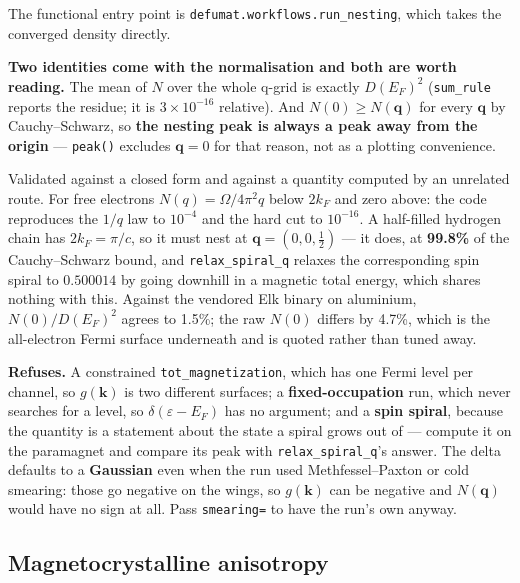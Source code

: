 \documentclass[11pt,a4paper]{article}
\newcommand{\code}[1]{\texttt{\small #1}}
\begin{document}
The functional entry point is \code{defumat.workflows.run\_nesting}, which
takes the converged density directly.

\textbf{Two identities come with the normalisation and both are worth reading.}
The mean of $N$ over the whole q-grid is exactly $D(E_F)^2$
(\code{sum\_rule} reports the residue; it is $3\times10^{-16}$ relative). And
$N(0) \ge N(\mathbf q)$ for every $\mathbf q$ by Cauchy--Schwarz, so
\textbf{the nesting peak is always a peak away from the origin} ---
\code{peak()} excludes $\mathbf q = 0$ for that reason, not as a plotting
convenience.

Validated against a closed form and against a quantity computed by an unrelated
route. For free electrons $N(q) = \Omega/4\pi^2 q$ below $2k_F$ and zero above:
the code reproduces the $1/q$ law to $10^{-4}$ and the hard cut to $10^{-16}$. A
half-filled hydrogen chain has $2k_F = \pi/c$, so it must nest at
$\mathbf q = (0,0,\tfrac12)$ --- it does, at \textbf{99.8\%} of the
Cauchy--Schwarz bound, and \code{relax\_spiral\_q} relaxes the corresponding
spin spiral to $0.500014$ by going downhill in a magnetic total energy, which
shares nothing with this. Against the vendored Elk binary on aluminium,
$N(0)/D(E_F)^2$ agrees to 1.5\%; the raw $N(0)$ differs by 4.7\%, which is the
all-electron Fermi surface underneath and is quoted rather than tuned away.

\begin{refuses}
\textbf{Refuses.} A constrained \code{tot\_magnetization}, which has one Fermi
level per channel, so $g(\mathbf k)$ is two different surfaces; a
\textbf{fixed-occupation} run, which never searches for a level, so
$\delta(\varepsilon - E_F)$ has no argument; and a \textbf{spin spiral}, because
the quantity is a statement about the state a spiral grows out of --- compute it
on the paramagnet and compare its peak with \code{relax\_spiral\_q}'s answer.
The delta defaults to a \textbf{Gaussian} even when the run used
Methfessel--Paxton or cold smearing: those go negative on the wings, so
$g(\mathbf k)$ can be negative and $N(\mathbf q)$ would have no sign at all.
Pass \code{smearing=} to have the run's own anyway.
\end{refuses}

\subsection{Magnetocrystalline anisotropy}
\end{document}
